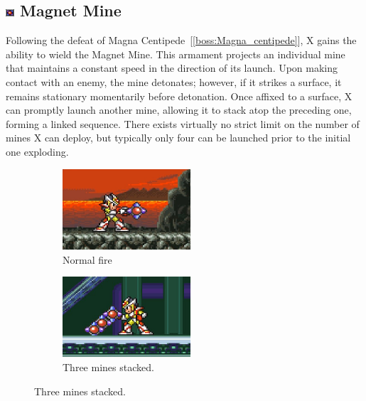 \subsection{\includegraphics[width=12px, height=10px]{figures/X2/weapons/M_mine.png} Magnet Mine}\label{Magnet_mine}

Following the defeat of Magna Centipede~[\ref{boss:Magna_centipede}], X gains the ability to wield the Magnet Mine. This armament projects an individual mine that maintains a constant speed in the direction of its launch. Upon making contact with an enemy, the mine detonates; however, if it strikes a surface, it remains stationary momentarily before detonation. Once affixed to a surface, X can promptly launch another mine, allowing it to stack atop the preceding one, forming a linked sequence. There exists virtually no strict limit on the number of mines X can deploy, but typically only four can be launched prior to the initial one exploding.
\begin{figure}[htp]
	\centering
	\begin{subfigure}{0.4\linewidth}
		\centering
		\includegraphics[height=3cm]{figures/X2/weapons/M_mine_1.png}	
		\caption{Normal fire}
	\end{subfigure}
	\begin{subfigure}{0.4\linewidth}
		\centering
		\includegraphics[height=3cm]{figures/X2/weapons/M_mine_2.png}	
		\caption{Three mines stacked.}
	\end{subfigure}
	\end{figure}
